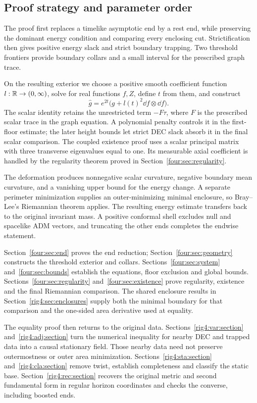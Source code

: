 \subsection{Proof strategy and parameter order}

The proof first replaces a timelike asymptotic end by a rest end,
while preserving the dominant energy condition and comparing every
enclosing cut. Strictification then gives positive energy slack and
strict boundary trapping. Two threshold frontiers provide boundary
collars and a small interval for the prescribed graph trace.

On the resulting exterior we choose a positive smooth coefficient
function $l:\mathbb R\to(0,\infty)$, solve for real functions $f,Z$, define
$t$ from them, and construct
\[
 \widehat g=e^{2t}\bigl(g+l(t)^2\dd f\otimes\dd f\bigr).
\]
The scalar identity retains the unrestricted term $-F\tau$, where
$F$ is the prescribed scalar trace in the graph equation.
A polynomial penalty controls it in the first-floor estimate; the
later height bounds let strict DEC slack absorb it in the final scalar
comparison. The coupled existence proof uses a scalar principal matrix
with three transverse eigenvalues equal to one. Its measurable axial
coefficient is handled by the regularity theorem proved in
Section~\ref{four:sec:regularity}.

The deformation produces nonnegative scalar curvature, negative boundary
mean curvature, and a vanishing upper bound for the energy change.
A separate perimeter minimization supplies an outer-minimizing minimal
enclosure, so Bray--Lee's Riemannian theorem applies. The resulting
energy estimate transfers back to the original invariant mass.
A positive conformal shell excludes null and spacelike ADM vectors,
and truncating the other ends completes the endwise statement.

Section~\ref{four:sec:end} proves the end reduction;
Section~\ref{four:sec:geometry} constructs the threshold exterior and collars.
Sections~\ref{four:sec:system} and~\ref{four:sec:bounds} establish the equations,
floor exclusion and global bounds. Sections~\ref{four:sec:regularity}
and~\ref{four:sec:existence} prove regularity, existence and the final
Riemannian comparison. The shared enclosure results in
Section~\ref{rig4:sec:enclosures} supply both the minimal boundary for
that comparison and the one-sided area derivative used at equality.

The equality proof then returns to the original data.
Sections~\ref{rig4:var:section} and~\ref{rig4:adj:section} turn the
numerical inequality for nearby DEC and trapped data into a causal
stationary field. Those nearby data need not preserve outermostness
or outer area minimization. Sections~\ref{rig4:sta:section}
and~\ref{rig4:cla:section} remove twist, establish completeness and
classify the static base. Section~\ref{rig4:rec:section} recovers the
original metric and second fundamental form in regular horizon
coordinates and checks the converse, including boosted ends.

